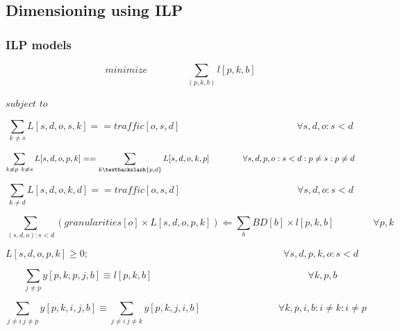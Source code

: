 \subsection{Dimensioning using ILP}

\subsubsection{ILP models}

\begin{equation}
minimize \qquad \qquad   \sum_{(p,k,b)} l[p,k,b]
\label{ILPTransluc}
\end{equation}

$subject$ $to$

\begin{equation}
\sum_{k \neq s} L[s,d,o,s,k] == traffic[o,s,d]
\qquad \qquad \qquad \qquad \qquad \qquad
\forall s,d,o : s < d
\label{ILPTransluc1}
\end{equation}

\begin{equation}
\sum_{k \neq p \ k \neq s} L[s,d,o,p,k] == \sum_{k\textbackslash \{p,d\}} L[s,d,o,k,p]
\qquad \qquad
\forall s,d,p,o : s < d : p \neq s : p \neq d
\label{ILPTransluc2}
\end{equation}

\begin{equation}
\sum_{k \neq d} L[s,d,o,k,d] == traffic[o,s,d]
\qquad \qquad \qquad \qquad \qquad \qquad
\forall s,d,o : s < d
\label{ILPTransluc3}
\end{equation}

\begin{equation}
\sum_{(s,d,o): s<d} (granularities[o] \times L[s,d,o,p,k]) \Leftarrow  \sum_{b} BD[b] \times l[p,k,b]
\qquad \qquad
\forall p,k 
\label{ILPTransluc4}
\end{equation}

\begin{equation}
L[s,d,o,p,k] \geq 0;
\qquad \qquad \qquad \qquad \qquad \qquad \qquad \qquad \qquad \qquad
\forall s,d,p,k,o : s < d
\label{ILPTransluc5}
\end{equation}

\begin{equation}
\sum_{j \neq p} y[p,k,p,j,b] \equiv l[p,k,b]
\qquad \qquad \qquad \qquad \qquad \qquad \qquad \qquad
\forall k,p,b
\label{ILPTransluc6}
\end{equation}

\begin{equation}
\sum_{j\neq i \ j\neq p} y[p,k,i,j,b] \equiv \sum_{j \neq i \ j \neq k} y[p,k,j,i,b]
\qquad \qquad \qquad \qquad
\forall k,p,i,b : i \neq k : i \neq p
\label{ILPTransluc7}
\end{equation}

